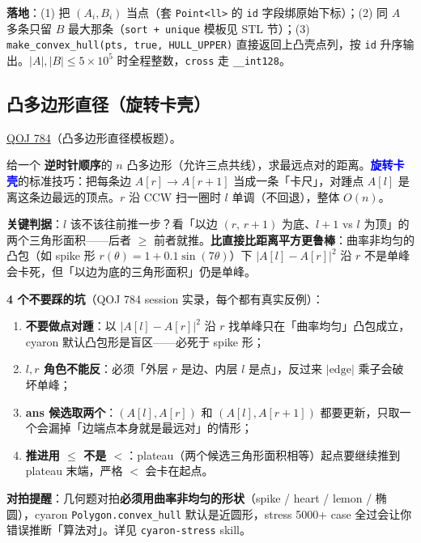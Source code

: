 		\textbf{落地}：(1) 把 $(A_i, B_i)$ 当点（套 \texttt{Point<ll>} 的 \texttt{id} 字段绑原始下标）；(2) 同 $A$ 多条只留 $B$ 最大那条（\texttt{sort + unique} 模板见 STL 节）；(3) \texttt{make\_convex\_hull(pts, true, HULL\_UPPER)} 直接返回上凸壳点列，按 \texttt{id} 升序输出。$|A|, |B| \le 5 \times 10^5$ 时全程整数，\texttt{cross} 走 \texttt{\_\_int128}。

		\subsection{凸多边形直径（旋转卡壳）}

		\href{https://vjudge.net/problem/QOJ-784}{QOJ 784}（凸多边形直径模板题）。

		给一个 \textbf{逆时针顺序}的 $n$ 凸多边形（允许三点共线），求最远点对的距离。\textcolor{blue}{\textbf{旋转卡壳}}的标准技巧：把每条边 $A[r] \to A[r{+}1]$ 当成一条「卡尺」，对踵点 $A[l]$ 是离这条边最远的顶点。$r$ 沿 CCW 扫一圈时 $l$ 单调（不回退），整体 $O(n)$。

		\textbf{关键判据}：$l$ 该不该往前推一步？看「以边 $(r,\,r{+}1)$ 为底、$l{+}1$ vs $l$ 为顶」的两个三角形面积——后者 $\ge$ 前者就推。\textbf{比直接比距离平方更鲁棒}：曲率非均匀的凸包（如 spike 形 $r(\theta) = 1 + 0.1\sin(7\theta)$）下 $|A[l] - A[r]|^2$ 沿 $r$ 不是单峰会卡死，但「以边为底的三角形面积」仍是单峰。

		\textbf{4 个不要踩的坑}（QOJ 784 session 实录，每个都有真实反例）：
		\begin{enumerate}
					\setlength\itemsep{0pt}
				\item \textbf{不要做点对踵}：以 $|A[l] - A[r]|^2$ 沿 $r$ 找单峰只在「曲率均匀」凸包成立，cyaron 默认凸包形是盲区——必死于 spike 形；
				\item \textbf{$l, r$ 角色不能反}：必须「外层 $r$ 是边、内层 $l$ 是点」，反过来 $|\text{edge}|$ 乘子会破坏单峰；
				\item \textbf{ans 候选取两个}：$(A[l], A[r])$ 和 $(A[l], A[r{+}1])$ 都要更新，只取一个会漏掉「边端点本身就是最远对」的情形；
				\item \textbf{推进用 $\le$ 不是 $<$}：plateau（两个候选三角形面积相等）起点要继续推到 plateau 末端，严格 $<$ 会卡在起点。
		\end{enumerate}

		\textbf{对拍提醒}：几何题对拍\textbf{必须用曲率非均匀的形状}（spike / heart / lemon / 椭圆），cyaron \texttt{Polygon.convex\_hull} 默认是近圆形，stress 5000+ case 全过会让你错误推断「算法对」。详见 \texttt{cyaron-stress} skill。

